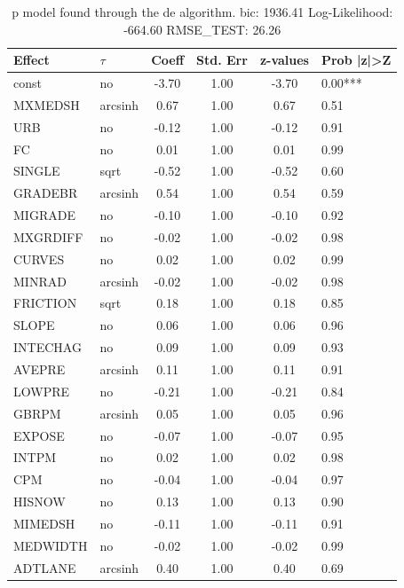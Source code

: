 \begin{table}
	\caption{p model found through the de algorithm. bic: 1936.41 Log-Likelihood: -664.60 RMSE_TEST: 26.26}
	\begin{center}
		\begin{tabular}{|l|l|c|c|c|l|}
			\hline
			Effect & $\tau$ & Coeff & Std. Err & z-values & Prob |z|>Z \\
			\hline
			const & no & -3.70 & 1.00 & -3.70 & 0.00*** \\
			\hline
			MXMEDSH & arcsinh & 0.67 & 1.00 & 0.67 & 0.51 \\
			\hline
			URB & no & -0.12 & 1.00 & -0.12 & 0.91 \\
			\hline
			FC & no & 0.01 & 1.00 & 0.01 & 0.99 \\
			\hline
			SINGLE & sqrt & -0.52 & 1.00 & -0.52 & 0.60 \\
			\hline
			GRADEBR & arcsinh & 0.54 & 1.00 & 0.54 & 0.59 \\
			\hline
			MIGRADE & no & -0.10 & 1.00 & -0.10 & 0.92 \\
			\hline
			MXGRDIFF & no & -0.02 & 1.00 & -0.02 & 0.98 \\
			\hline
			CURVES & no & 0.02 & 1.00 & 0.02 & 0.99 \\
			\hline
			MINRAD & arcsinh & -0.02 & 1.00 & -0.02 & 0.98 \\
			\hline
			FRICTION & sqrt & 0.18 & 1.00 & 0.18 & 0.85 \\
			\hline
			SLOPE & no & 0.06 & 1.00 & 0.06 & 0.96 \\
			\hline
			INTECHAG & no & 0.09 & 1.00 & 0.09 & 0.93 \\
			\hline
			AVEPRE & arcsinh & 0.11 & 1.00 & 0.11 & 0.91 \\
			\hline
			LOWPRE & no & -0.21 & 1.00 & -0.21 & 0.84 \\
			\hline
			GBRPM & arcsinh & 0.05 & 1.00 & 0.05 & 0.96 \\
			\hline
			EXPOSE & no & -0.07 & 1.00 & -0.07 & 0.95 \\
			\hline
			INTPM & no & 0.02 & 1.00 & 0.02 & 0.98 \\
			\hline
			CPM & no & -0.04 & 1.00 & -0.04 & 0.97 \\
			\hline
			HISNOW & no & 0.13 & 1.00 & 0.13 & 0.90 \\
			\hline
			MIMEDSH & no & -0.11 & 1.00 & -0.11 & 0.91 \\
			\hline
			MEDWIDTH & no & -0.02 & 1.00 & -0.02 & 0.99 \\
			\hline
			ADTLANE & arcsinh & 0.40 & 1.00 & 0.40 & 0.69 \\

\end{tabular}
\end{center}
\end{table}
